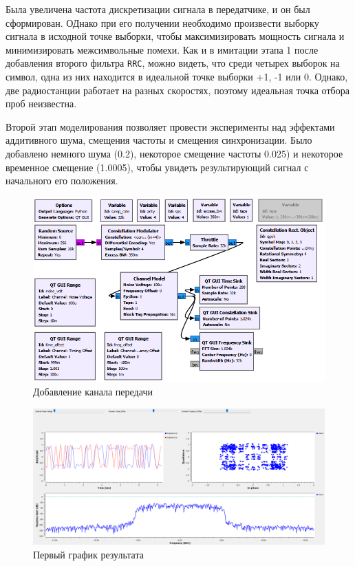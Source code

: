 \documentclass[a4paper]{article}
\begin{document}
           Была увеличена частота дискретизации сигнала в передатчике, и он был сформирован. ОДнако при его получении необходимо произвести выборку сигнала в исходной точке выборки, чтобы максимизировать мощность сигнала и минимизировать межсимвольные помехи. Как и в имитации этапа 1 после добавления второго фильтра \texttt{RRC}, можно видеть, что среди четырех выборок на символ, одна из них находится в идеальной точке выборки +1, -1 или 0. Однако, две радиостанции работает на разных скоростях, поэтому идеальная точка отбора проб неизвестна. 
           
           Второй этап моделирования позволяет провести эксперименты над эффектами аддитивного шума, смещения частоты и смещения синхронизации. Было добавлено немного шума (0.2), некоторое смещение частоты 0.025) и некоторое временное смещение (1.0005), чтобы увидеть результирующий сигнал с начального его положения.
           
           \begin{figure}[H]
                \centering
                \includegraphics[width=\textwidth]{img/p2_1.png}
                \caption{Добавление канала передачи}
                \label{fig:p2_1}
            \end{figure}
           
           \begin{figure}[H]
                \centering
                \includegraphics[width=\textwidth]{img/p2_2.png}
                \caption{Первый график результата}
                \label{fig:p2_2}
            \end{figure}
           
\end{document}

